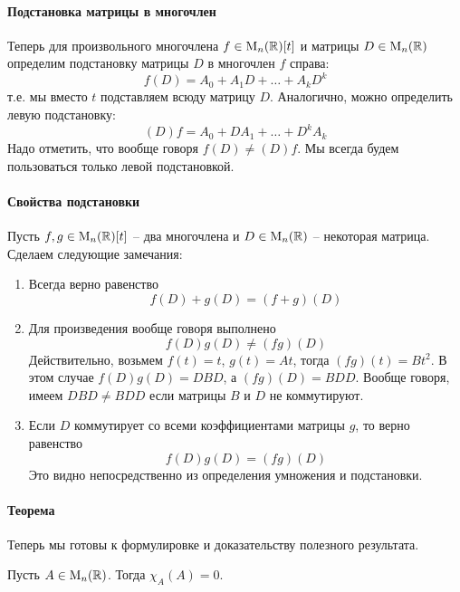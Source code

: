 \paragraph{Подстановка матрицы в многочлен} 

Теперь для произвольного многочлена $f\in\operatorname{M}_{n}(\mathbb R)[t]$ и матрицы $D\in\operatorname{M}_{n}(\mathbb R)$ определим подстановку матрицы $D$ в многочлен $f$ справа:
\[
f(D) = A_0 + A_1 D + \ldots + A_k D^k
\]
т.е. мы вместо $t$ подставляем всюду матрицу $D$. Аналогично, можно определить левую подстановку:
\[
(D)f = A_0 + D A_1 + \ldots + D^k A_k
\]
Надо отметить, что вообще говоря $f(D)\neq (D)f$. Мы всегда будем пользоваться только левой подстановкой.

\paragraph{Свойства подстановки}

Пусть $f,g\in\operatorname{M}_{n}(\mathbb R)[t]$ -- два многочлена и $D\in\operatorname{M}_{n}(\mathbb R)$ -- некоторая матрица. Сделаем следующие замечания:
\begin{enumerate}
\item Всегда верно равенство
\[
f(D) + g(D) = (f + g)(D)
\]
\item Для произведения вообще говоря выполнено
\[
f(D)g(D)\neq (fg)(D)
\]
Действительно, возьмем $f(t) = t$, $g(t) = At$, тогда $(fg)(t) = Bt^2$. В этом случае $f(D)g(D) = DBD$, а $(fg)(D) = BDD$. Вообще говоря, имеем $DBD \neq BDD$ если матрицы $B$ и $D$ не коммутируют.

\item Если $D$ коммутирует со всеми коэффициентами матрицы $g$, то верно равенство
\[
f(D)g(D) = (fg)(D)
\]
Это видно непосредственно из определения умножения и подстановки.
\end{enumerate}

\paragraph{Теорема} Теперь мы готовы к формулировке и доказательству полезного результата.

\begin{claim}
Пусть $A\in\operatorname{M}_{n}(\mathbb R)$. Тогда $\chi_A(A) = 0$.
\end{claim}

